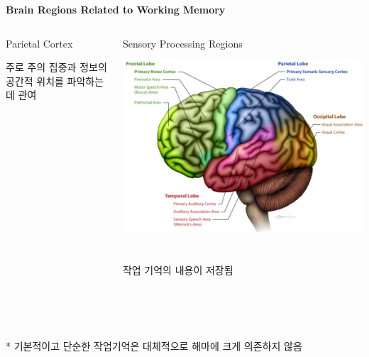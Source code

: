 \documentclass{beamer}
\begin{document}
\begin{frame}{\textbf{Brain Regions Related to Working Memory}}
\begin{columns}
\begin{column}{0.31\textwidth}
\begin{block}{Parietal Cortex}
\begin{minipage}[t][5cm][c]{\textwidth}
          주로 주의 집중과 정보의 공간적 위치를 파악하는 데 관여
        \end{minipage}
      \end{block}
    \end{column}
    \hfill
    \begin{column}{0.31\textwidth}
      \begin{block}{Sensory Processing Regions}
        \begin{minipage}[t][5cm][c]{\textwidth}
          \centering
          \includegraphics[width=\textwidth]{image/working_memory_b3}\\~\\~\\
          작업 기억의 내용이 저장됨
        \end{minipage}
      \end{block}
    \end{column}
  \end{columns}\\~\\~\\
  \large ** 기본적이고 단순한 작업기억은 대체적으로 해마에 크게 의존하지 않음
\end{frame}
\end{document}
